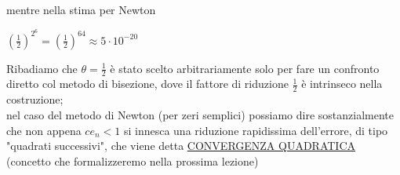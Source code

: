 \documentclass[12pt]{article}
\begin{document}
mentre nella stima per Newton\\
\begin{center}
    $(\frac{1}{2})^{2^6}=(\frac{1}{2})^{64}\approx 5\cdot10^{-20}$
\end{center}
Ribadiamo che $\theta=\frac{1}{2}$ è stato scelto arbitrariamente solo per fare un confronto diretto col metodo di bisezione, dove il fattore di riduzione $\frac{1}{2}$ è intrinseco nella costruzione;\\
nel caso del metodo di Newton (per zeri semplici) possiamo dire sostanzialmente che non appena $ce_n<1$ si innesca una riduzione rapidissima dell'errore, di tipo "quadrati successivi", che viene detta \underline{CONVERGENZA QUADRATICA} (concetto che formalizzeremo nella prossima lezione)
\end{document}
